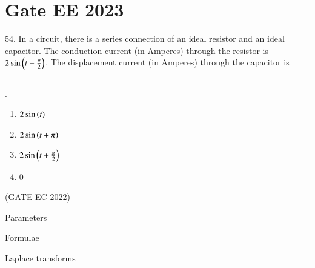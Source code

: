 \documentclass[journal,12pt,twocolumn]{IEEEtran}
\begin{document}


\vspace{3cm}

\title{}
\author{EE23BTECH11054 -  Sai Krishna Shanigarapu$^{*}$
}
\maketitle
\newpage
\bigskip


\section*{Gate EE 2023}
54. \hspace{2pt}In a circuit, there is a series connection of an ideal resistor and an ideal capacitor.
The conduction current (in Amperes) through the resistor is $2\sin\left(t + \frac{\pi}{2}\right)$. The displacement current (in Amperes) through the capacitor is \rule{1cm}{0.15mm}.\\ 
\begin{enumerate}[label=(\Alph*)]
    \item $2\sin\left(t\right)$
    \item $2\sin\left(t+\pi\right)$
    \item $2\sin\left(t +\frac{\pi}{2}\right)$
    \item $0$
\end{enumerate}
\hfill(GATE EC 2022)

\solution

\begin{table}[ht]
     \begin{adjustbox}{width=\columnwidth}
       
    \end{adjustbox}
    \caption{Parameters}
    \label{tab:tab_gate_ec_2022_24_1}
\end{table}


\begin{table}[ht]
     \begin{adjustbox}{width=\columnwidth}
       
    \end{adjustbox}
    \caption{Formulae}
    \label{tab:tab_gate_ec_2022_24_2}
\end{table}

\begin{table}[ht]
     \begin{adjustbox}{width=\columnwidth}
       
    \end{adjustbox}
    \caption{Laplace transforms}
    \label{tab:tab_gate_ec_2022_24_3}
\end{table}
\end{document}
